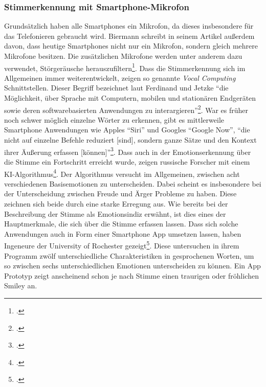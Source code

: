 \subsubsection{Stimmerkennung mit Smartphone-Mikrofon}
Grundsätzlich haben alle Smartphones ein Mikrofon, da dieses insbesondere für das Telefonieren gebraucht wird. Biermann schreibt in seinem Artikel außerdem davon, dass heutige Smartphones nicht nur ein Mikrofon, sondern gleich mehrere Mikrofone besitzen. Die zusätzlichen Mikrofone werden unter anderem dazu verwendet, Störgeräusche herauszufiltern\footcite[Vgl. ][S.2 Mikrofon Abs.2]{Bie14}.\newline
Dass die Stimmerkennung sich im Allgemeinen immer weiterentwickelt, zeigen so genannte \textit{Vocal Computing} Schnittstellen. Dieser Begriff bezeichnet laut Ferdinand und Jetzke ``die Möglichkeit, über Sprache mit Computern, mobilen und stationären Endgeräten sowie deren softwarebasierten Anwendungen zu interargieren''\footcite[siehe ][S.1 Z.1ff]{Fer17}. War es früher noch schwer möglich einzelne Wörter zu erkennen, gibt es mittlerweile Smartphone Anwendungen wie Apples ``Siri'' und Googles ``Google Now'', ``die nicht auf einzelne Befehle reduziert [sind], sondern ganze Sätze und den Kontext ihrer Äußerung erfassen [können]''\footcite[siehe ][S.1 Z.17ff]{Fer17}.\newline
Dass auch in der Emotionserkennung über die Stimme ein Fortschritt erreicht wurde, zeigen russische Forscher mit einem KI-Algorithmus\footcite[Vgl. ][]{Sta17}. Der Algorithmus versucht im Allgemeinen, zwischen acht verschiedenen Basisemotionen zu unterscheiden. Dabei scheint es insbesondere bei der Unterscheidung zwischen Freude und Ärger Probleme zu haben. Diese zeichnen sich beide durch eine starke Erregung aus. Wie bereits bei der Beschreibung der Stimme als Emotionsindiz erwähnt, ist dies eines der Hauptmerkmale, die sich über die Stimme erfassen lassen.\newline
Dass sich solche Anwendungen auch in Form einer Smartphone App umsetzen lassen, haben Ingeneure der University of Rochester gezeigt\footcite[Vgl. ][]{Wed12}. Diese untersuchen in ihrem Programm zwölf unterschiedliche Charakteristiken in gesprochenen Worten, um so zwischen sechs unterschiedlichen Emotionen unterscheiden zu können. Ein App Prototyp zeigt anscheinend schon je nach Stimme einen traurigen oder fröhlichen Smiley an.
